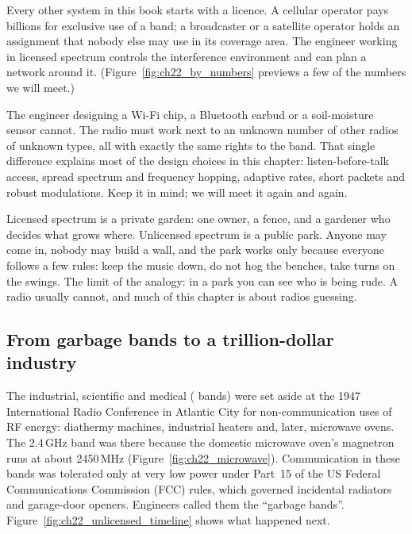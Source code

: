 Every other system in this book starts with a licence. A cellular operator pays billions for
exclusive use of a band; a broadcaster or a satellite operator holds an assignment that nobody
else may use in its coverage area. The engineer working in licensed spectrum controls the
interference environment and can plan a network around it. (Figure~\ref{fig:ch22_by_numbers} previews
a few of the numbers we will meet.)

The engineer designing a Wi-Fi chip, a Bluetooth earbud or a soil-moisture sensor cannot. The
radio must work next to an unknown number of other radios of unknown types, all with exactly the
same rights to the band. That single difference explains most of the design choices in this
chapter: listen-before-talk access, spread spectrum and frequency hopping, adaptive rates, short
packets and robust modulations. Keep it in mind; we will meet it again and again.


\begin{analogy}
Licensed spectrum is a private garden: one owner, a fence, and a gardener who decides what grows
where. Unlicensed spectrum is a public park. Anyone may come in, nobody may build a wall, and the
park works only because everyone follows a few rules: keep the music down, do not hog the
benches, take turns on the swings. The limit of the analogy: in a park you can see who is being
rude. A radio usually cannot, and much of this chapter is about radios guessing.
\end{analogy}

\subsection{From garbage bands to a trillion-dollar industry}

The industrial, scientific and medical ( bands) were set aside at the 1947 International
Radio Conference in Atlantic City for non-communication uses of RF energy: diathermy machines,
industrial heaters and, later, microwave ovens. The 2.4\,GHz band was there because the domestic
microwave oven's magnetron runs at about 2450\,MHz (Figure~\ref{fig:ch22_microwave}). Communication in these bands was tolerated only
at very low power under Part~15 of the US Federal Communications Commission (FCC) rules, which
governed incidental radiators and garage-door openers. Engineers called them the ``garbage bands''.
Figure~\ref{fig:ch22_unlicensed_timeline} shows what happened next.

